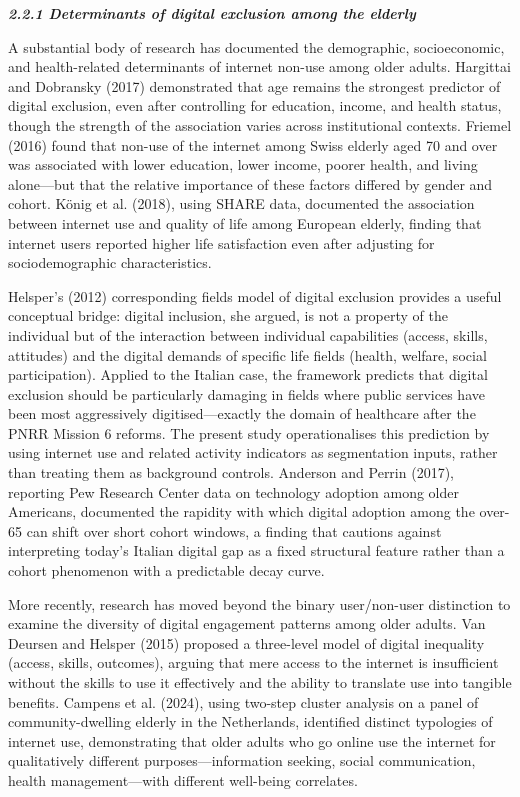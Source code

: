 \emph{\textbf{2.2.1 Determinants of digital exclusion among the elderly}}

A substantial body of research has documented the demographic, socioeconomic, and health-related determinants of internet non-use among older adults. Hargittai and Dobransky (2017) demonstrated that age remains the strongest predictor of digital exclusion, even after controlling for education, income, and health status, though the strength of the association varies across institutional contexts. Friemel (2016) found that non-use of the internet among Swiss elderly aged 70 and over was associated with lower education, lower income, poorer health, and living alone---but that the relative importance of these factors differed by gender and cohort. König et al. (2018), using SHARE data, documented the association between internet use and quality of life among European elderly, finding that internet users reported higher life satisfaction even after adjusting for sociodemographic characteristics.

Helsper's (2012) corresponding fields model of digital exclusion provides a useful conceptual bridge: digital inclusion, she argued, is not a property of the individual but of the interaction between individual capabilities (access, skills, attitudes) and the digital demands of specific life fields (health, welfare, social participation). Applied to the Italian case, the framework predicts that digital exclusion should be particularly damaging in fields where public services have been most aggressively digitised---exactly the domain of healthcare after the PNRR Mission 6 reforms. The present study operationalises this prediction by using internet use and related activity indicators as segmentation inputs, rather than treating them as background controls. Anderson and Perrin (2017), reporting Pew Research Center data on technology adoption among older Americans, documented the rapidity with which digital adoption among the over-65 can shift over short cohort windows, a finding that cautions against interpreting today's Italian digital gap as a fixed structural feature rather than a cohort phenomenon with a predictable decay curve.

More recently, research has moved beyond the binary user/non-user distinction to examine the diversity of digital engagement patterns among older adults. Van Deursen and Helsper (2015) proposed a three-level model of digital inequality (access, skills, outcomes), arguing that mere access to the internet is insufficient without the skills to use it effectively and the ability to translate use into tangible benefits. Campens et al. (2024), using two-step cluster analysis on a panel of community-dwelling elderly in the Netherlands, identified distinct typologies of internet use, demonstrating that older adults who go online use the internet for qualitatively different purposes---information seeking, social communication, health management---with different well-being correlates.

